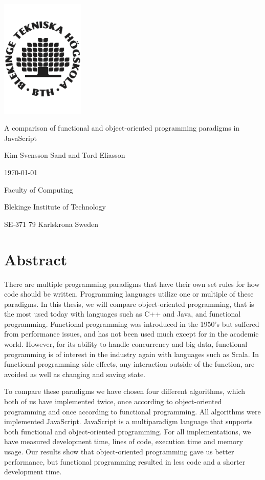 \documentclass {article}
\begin{document}
\begin{titlepage}
	\centering
	\includegraphics[width=0.3\textwidth]{bth-logo} \par
	{\LARGE A comparison of functional and object-oriented programming paradigms in JavaScript \par}
	\vspace{1cm}
{\large Kim Svensson Sand and Tord Eliasson \par}
{\large \today \par}
	\vfill

	{\normalsize Faculty of Computing \par}
	{\normalsize Blekinge Institute of Technology \par}
	{\normalsize SE-371 79 Karlskrona Sweden \par}
\end{titlepage}
\newpage
\section*{Abstract}
There are multiple programming paradigms that have their own set rules for how code should be written. Programming languages utilize one or multiple of these paradigms. In this thesis, we will compare object-oriented programming, that is the most used today with languages such as C++ and Java, and functional programming. Functional programming was introduced in the 1950's but suffered from performance issues, and has not been used much except for in the academic world. However, for its ability to handle concurrency and big data, functional programming is of interest in the industry again with languages such as Scala. In functional programming side effects, any interaction outside of the function, are avoided as well as changing and saving state. 
 
To compare these paradigms we have chosen four different algorithms, which both of us have implemented twice, once according to object-oriented programming and once according to functional programming. All algorithms were implemented JavaScript. JavaScript is a multiparadigm language that supports both functional and object-oriented programming. For all implementations, we have measured development time, lines of code, execution time and memory usage. Our results show that object-oriented programming gave us better performance, but functional programming resulted in less code and a shorter development time. 
\end{document}
